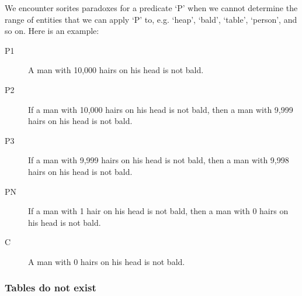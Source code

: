 \documentclass[oneside]{article}
\begin{document}
We encounter sorites paradoxes for a predicate `P' when we cannot determine the range of entities that we can apply `P' to, e.g. `heap', `bald', `table', `person', and so on. Here is an example:\\ 

\begin{description}
\item[P1] A man with 10,000 hairs on his head is not bald.
\item[P2] If a man with 10,000 hairs on his head is not bald,  then a man with 9,999 hairs on his head is not bald.
\item [P3] If a man with 9,999 hairs on his head is not bald, then a man with 9,998 hairs on his head is not bald. 
\item [PN] If a man with 1 hair on his head is not bald, then a man with 0 hairs on his head is not bald.
\item[C] A man with 0 hairs on his head is not bald.
\end{description}


\subsubsection*{Tables do not exist}
\end{document}
